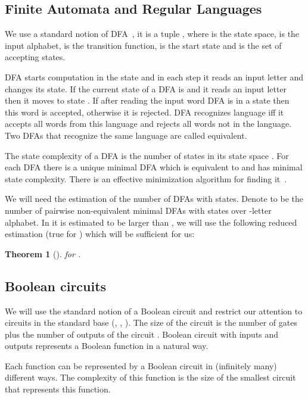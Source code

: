 \documentclass[copyright, creativecommons]{eptcs}
\newtheorem{theorem}{Theorem}[section]
\begin{document}
\subsection{Finite Automata and Regular Languages}
We use a standard notion of DFA~\cite{M55}, it is a tuple , where
 is the state space,
 is the input alphabet,
 is the transition function,
 is the start state and
 is the set of accepting states.


DFA starts computation
in the state  and in each step it reads an input letter   and changes its state.
If the current state of a DFA is  and it reads an input letter  then it
moves to state . If after reading the input word DFA
is in a state  then this word is accepted, otherwise it is rejected. DFA  recognizes
language  iff it accepts all words from this language and rejects all words not in the language.
Two DFAs that recognize the same language are called equivalent.
 
The state complexity of a DFA is the number of states in its state space . For each DFA 
there is a unique minimal DFA  which is equivalent to  and has minimal state complexity.
There is an effective minimization algorithm for finding it~\cite{B70}.

We will need the estimation of the number of DFAs with  states.
Denote  to be
the number of pairwise non-equivalent minimal DFAs with  states over -letter alphabet.
In \cite{S01} it is estimated to be larger
than , we will use the following reduced estimation (true for ) which will be sufficient for us:
\begin{theorem}[\cite{S01}]
\label{autSkaits}
 for .
\end{theorem} 

\subsection{Boolean circuits}

We will use the standard notion of a Boolean circuit
and restrict our attention to circuits in the standard base (, , ).
The size of the circuit  is
the number of gates plus the number of outputs of the circuit .
Boolean circuit  with  inputs and  outputs represents a Boolean function  in a natural way.

Each function  can be represented by a Boolean circuit in (infinitely many) different ways.
The complexity of this function  is the size of the smallest circuit that represents this function.
\end{document}

